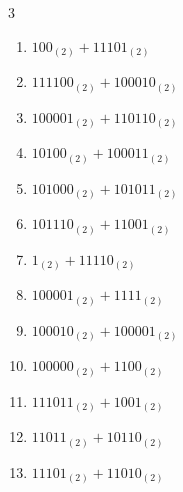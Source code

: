 \begin{multicols}{3}
\begin{enumerate}
  \item $100_{(2)} + 11101_{(2)}$


\columnbreak %

  \item $111100_{(2)} + 100010_{(2)}$


  \item $100001_{(2)} + 110110_{(2)}$


  \item $10100_{(2)} + 100011_{(2)}$


  \item $101000_{(2)} + 101011_{(2)}$


  \item $101110_{(2)} + 11001_{(2)}$


  \item $1_{(2)} + 11110_{(2)}$


  \item $100001_{(2)} + 1111_{(2)}$


  \item $100010_{(2)} + 100001_{(2)}$


  \item $100000_{(2)} + 1100_{(2)}$


  \item $111011_{(2)} + 1001_{(2)}$


\columnbreak %

  \item $11011_{(2)} + 10110_{(2)}$


  \item $11101_{(2)} + 11010_{(2)}$



\end{enumerate}
\end{multicols}
